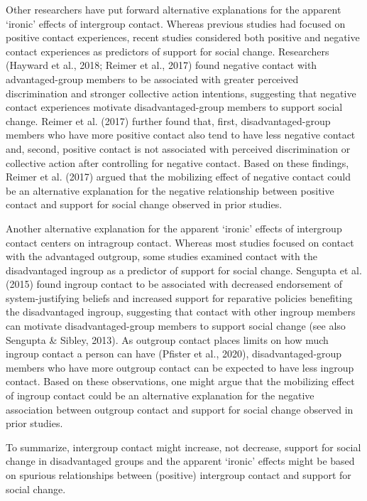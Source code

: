 \documentclass[12pt, letterpaper]{article}
\begin{document}
Other researchers have put forward alternative explanations for the
apparent `ironic' effects of intergroup contact. Whereas previous
studies had focused on positive contact experiences, recent studies
considered both positive and negative contact experiences as predictors
of support for social change. Researchers (Hayward et al., 2018; Reimer
et al., 2017) found negative contact with advantaged-group members to be
associated with greater perceived discrimination and stronger collective
action intentions, suggesting that negative contact experiences motivate
disadvantaged-group members to support social change. Reimer et al.
(2017) further found that, first, disadvantaged-group members who have
more positive contact also tend to have less negative contact and,
second, positive contact is not associated with perceived discrimination
or collective action after controlling for negative contact. Based on
these findings, Reimer et al. (2017) argued that the mobilizing effect
of negative contact could be an alternative explanation for the negative
relationship between positive contact and support for social change
observed in prior studies.

Another alternative explanation for the apparent `ironic' effects of
intergroup contact centers on intragroup contact. Whereas most studies
focused on contact with the advantaged outgroup, some studies examined
contact with the disadvantaged ingroup as a predictor of support for
social change. Sengupta et al. (2015) found ingroup contact to be
associated with decreased endorsement of system-justifying beliefs and
increased support for reparative policies benefiting the disadvantaged
ingroup, suggesting that contact with other ingroup members can motivate
disadvantaged-group members to support social change (see also Sengupta
\& Sibley, 2013). As outgroup contact places limits on how much ingroup
contact a person can have (Pfister et al., 2020), disadvantaged-group
members who have more outgroup contact can be expected to have less
ingroup contact. Based on these observations, one might argue that the
mobilizing effect of ingroup contact could be an alternative explanation
for the negative association between outgroup contact and support for
social change observed in prior studies.

To summarize, intergroup contact might increase, not decrease, support
for social change in disadvantaged groups and the apparent `ironic'
effects might be based on spurious relationships between (positive)
intergroup contact and support for social change.
\end{document}
